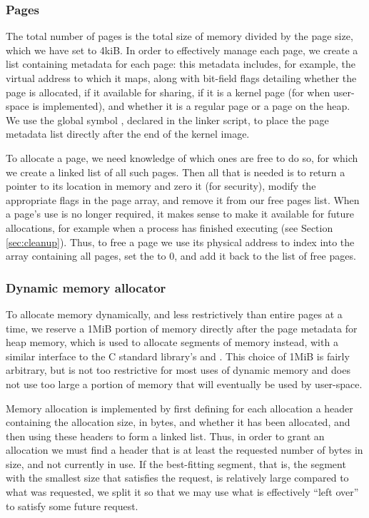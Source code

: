     \subsubsection{Pages}
        \label{sec:pages}
        The total number of pages is the total size of memory divided by the
        page size, which we have set to 4kiB. In order to effectively manage
        each page, we create a list containing metadata for each page: this
        metadata includes, for example, the virtual address to which it maps,
        along with bit-field flags detailing whether the page is allocated, if
        it available for sharing, if it is a kernel page (for when user-space is
        implemented), and whether it is a regular page or a page on the heap.
        We use the global symbol , declared in the linker script,
        to place the page metadata list directly after the end of the kernel
        image.

        To allocate a page, we need knowledge of which ones are free to do so,
        for which we create a linked list of all such pages. Then all that is
        needed is to return a pointer to its location in memory and zero it (for
        security), modify the appropriate flags in the page array, and remove it
        from our free pages list. When a page's use is no longer required, it
        makes sense to make it available for future allocations, for example
        when a process has finished executing (see Section \ref{sec:cleanup}).
        Thus, to free a page we use its physical address to index into the array
        containing all pages, set the  to 0, and add it back to
        the list of free pages.

    \subsubsection{Dynamic memory allocator}
        To allocate memory dynamically, and less restrictively than entire pages
        at a time, we reserve a 1MiB portion of memory directly after the page
        metadata for heap memory, which is used to allocate segments of memory
        instead, with a similar interface to the C standard library's
         and . This choice of 1MiB is fairly arbitrary,
        but is not too restrictive for most uses of dynamic memory and does not
        use too large a portion of memory that will eventually be used by
        user-space.
        
        Memory allocation is implemented by first defining for each allocation a
        header containing the allocation size, in bytes, and whether it has been
        allocated, and then using these headers to form a linked list. Thus, in
        order to grant an allocation we must find a header that is at least the
        requested number of bytes in size, and not currently in use. If the
        best-fitting segment, that is, the segment with the smallest size that
        satisfies the request, is relatively large compared to what was
        requested, we split it so that we may use what is effectively ``left
        over'' to satisfy some future request.

